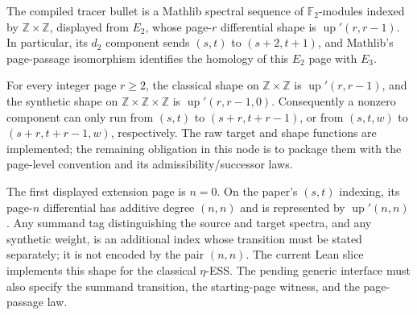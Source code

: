 \begin{definition}
  \label{def:classical-adams-e2-e3-shape-slice}
  \leanok
  The compiled tracer bullet is a Mathlib spectral sequence of
  $\mathbb F_2$-modules indexed by $\mathbb Z\times\mathbb Z$, displayed from
  $E_2$, whose page-$r$ differential shape is
  $\operatorname{up}'(r,r-1)$.  In particular, its $d_2$ component sends
  $(s,t)$ to $(s+2,t+1)$, and Mathlib's page-passage isomorphism identifies
  the homology of this $E_2$ page with $E_3$.
\end{definition}

\begin{definition}
  \label{def:adams-complex-shape}
  \notready
  For every integer page $r\ge2$, the classical shape on
  $\mathbb Z\times\mathbb Z$ is $\operatorname{up}'(r,r-1)$, and the
  synthetic shape on $\mathbb Z\times\mathbb Z\times\mathbb Z$ is
  $\operatorname{up}'(r,r-1,0)$.  Consequently a nonzero component can only
  run from $(s,t)$ to $(s+r,t+r-1)$, or from $(s,t,w)$ to
  $(s+r,t+r-1,w)$, respectively.  The raw target and shape functions are
  implemented; the remaining obligation in this node is to package them with
  the page-level convention and its admissibility/successor laws.
\end{definition}

\begin{definition}
  \label{def:ess-complex-shape}
  \notready
  The first displayed extension page is $n=0$.  On the paper's $(s,t)$
  indexing, its page-$n$ differential has additive degree $(n,n)$ and is
  represented by $\operatorname{up}'(n,n)$.  Any summand tag distinguishing
  the source and target spectra, and any synthetic weight, is an additional
  index whose transition must be stated separately; it is not encoded by the
  pair $(n,n)$.  The current Lean slice implements this shape for the
  classical $\eta$-ESS.  The pending generic interface must also specify the
  summand transition, the starting-page witness, and the page-passage law.
\end{definition}


